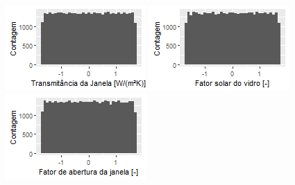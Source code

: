\documentclass{article}
\begin{document}
\begin{figure}[h!]
\begin{minipage}{.33\textwidth}
	\end{minipage}%
	\begin{minipage}{.33\textwidth}
		\centering
		\includegraphics[width=\linewidth]{zscore_plot_window_u.png}
	\end{minipage}
	\centering
	\begin{minipage}{.33\textwidth}
		\centering
		\includegraphics[width=\linewidth]{zscore_plot_shgc.png}
	\end{minipage}%
	\begin{minipage}{.33\textwidth}
		\centering
		\includegraphics[width=\linewidth]{zscore_plot_open_fac.png}

\end{minipage}
\end{figure}
\end{document}

